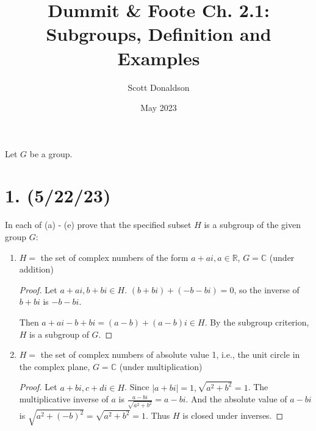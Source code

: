 \documentclass{article}
\title{Dummit \& Foote Ch. 2.1: Subgroups, Definition and Examples}
\author{Scott Donaldson}
\date{May 2023}
\begin{document}
\maketitle

Let $G$ be a group.

\section*{1. (5/22/23)}

In each of (a) - (e) prove that the specified subset $H$ is a subgroup of the given group $G$:

\begin{enumerate}[label=(\alph*)]
    \item $H = $ the set of complex numbers of the form $a + ai, a \in \mathbb{R}$, $G = \mathbb{C}$ (under addition)
          \begin{proof}
            Let $a + ai, b + bi \in H$. $(b + bi) + (-b - bi) = 0$, so the inverse of $b + bi$ is $-b - bi$.

            Then $a + ai - b + bi = (a - b) + (a - b)i \in H$. By the subgroup criterion, $H$ is a subgroup of $G$.
          \end{proof}
    \item $H = $ the set of complex numbers of absolute value 1, i.e., the unit circle in the complex plane, $G = \mathbb{C}$ (under multiplication)
          \begin{proof}
            Let $a + bi, c + di \in H$. Since $|a + bi| = 1, \sqrt{a^2 + b^2} = 1$. The multiplicative inverse of $a$ is $\frac{a - bi}{\sqrt{a^2 + b^2}} = a - bi$. And the absolute value of $a - bi$ is $\sqrt{a^2 + (-b)^2} = \sqrt{a^2 + b^2} = 1$. Thus $H$ is closed under inverses.


\end{proof}
\end{enumerate}
\end{document}
